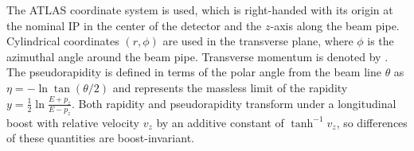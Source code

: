 The ATLAS coordinate system is used, which is right-handed with its origin at the nominal \ac{IP} in the center of the detector and the $z$-axis along the beam pipe.
Cylindrical coordinates $(r,\phi)$ are used in the transverse plane, where $\phi$ is the azimuthal angle around the beam pipe.
Transverse momentum is denoted by \pt.
The pseudorapidity is defined in terms of the polar angle from the beam line $\theta$ as $\eta=-\ln\tan(\theta/2)$ and represents the massless limit of the rapidity $y = \frac{1}{2} \ln \frac{E + p_z}{E - p_z}$.
Both rapidity and pseudorapidity transform under a longitudinal boost with relative velocity $v_z$ by an additive constant of $\tanh^{-1} v_z$, so differences of these quantities are boost-invariant.
